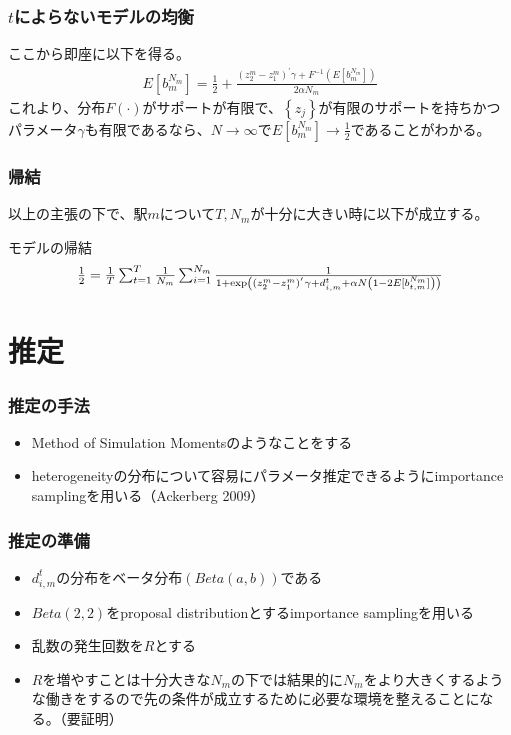 \documentclass[dvipdfmx, 12pt]{beamer}
\begin{document}
\begin{frame}\frametitle{$t$によらないモデルの均衡}
	ここから即座に以下を得る。
        \begin{align*}
        	E[b_m^{N_m}] = \frac{1}{2} + \frac{(z_2^m - z_1^m)^{'}\gamma + F^{-1} \left( E[b_m^{N_m}] \right)}{2\alpha N_m}
        \end{align*}
これより、分布$F(\cdot)$がサポートが有限で、$\left\{ z_j \right\}$が有限のサポートを持ちかつパラメータ$\gamma$も有限であるなら、$N \to \infty$で$E[b_m^{N_m}] \to \frac{1}{2}$であることがわかる。
\end{frame}

\begin{frame}\frametitle{帰結}
	以上の主張の下で、駅$m$について$T,N_m$が十分に大きい時に以下が成立する。
	
	\begin{itembox}[l]{モデルの帰結}
        \begin{align*}
        \scalebox{1}{$
        	\frac{1}{2} = \frac{1}{T}\sum_{t = 1}^T \frac{1}{N_m}\sum_{i = 1}^{N_m} \frac{1}{1 + \exp\left( (z_2^m - z_1^m)^{'}\gamma + d_{i,m}^t + \alpha N \left(1 - 2E[b_{t,m}^{N_m}]\right) \right)} $}
        \end{align*}
        \end{itembox}
\end{frame}

\section{推定}
\begin{frame}\frametitle{推定の手法}
	\begin{itemize}
		\item Method of Simulation Momentsのようなことをする
		\item heterogeneityの分布について容易にパラメータ推定できるようにimportance samplingを用いる（Ackerberg 2009）
	\end{itemize}
\end{frame}

\begin{frame}\frametitle{推定の準備}
	\begin{itemize}
		\item $d_{i,m}^t$の分布をベータ分布$(Beta(a, b))$である
		\item $Beta(2,2)$をproposal distributionとするimportance samplingを用いる
		\item 乱数の発生回数を$R$とする
		\item $R$を増やすことは十分大きな$N_m$の下では結果的に$N_m$をより大きくするような働きをするので先の条件が成立するために必要な環境を整えることになる。（要証明）
	\end{itemize}
\end{frame}
\end{document}
